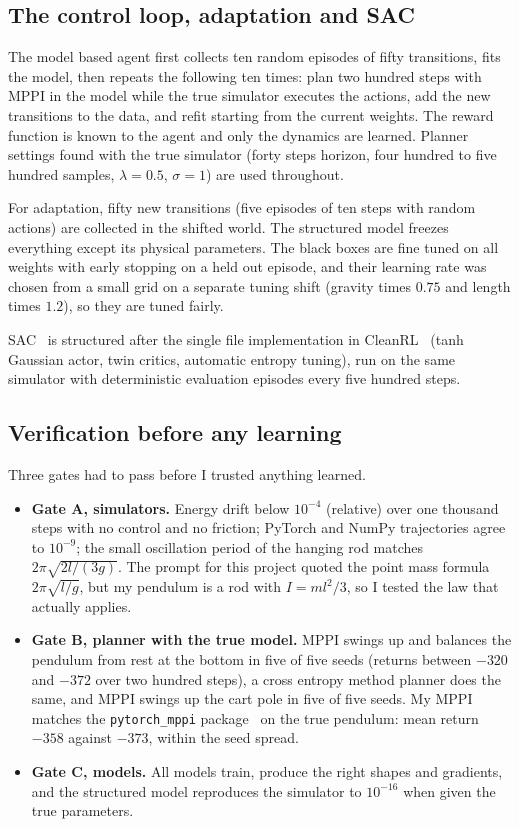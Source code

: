\documentclass[11pt,a4paper]{article}
\begin{document}
\subsection{The control loop, adaptation and SAC}
The model based agent first collects ten random episodes of fifty transitions, fits the model, then repeats the following ten times: plan two hundred steps with MPPI in the model while the true simulator executes the actions, add the new transitions to the data, and refit starting from the current weights. The reward function is known to the agent and only the dynamics are learned. Planner settings found with the true simulator (forty steps horizon, four hundred to five hundred samples, $\lambda=0.5$, $\sigma=1$) are used throughout.

For adaptation, fifty new transitions (five episodes of ten steps with random actions) are collected in the shifted world. The structured model freezes everything except its physical parameters. The black boxes are fine tuned on all weights with early stopping on a held out episode, and their learning rate was chosen from a small grid on a separate tuning shift (gravity times $0.75$ and length times $1.2$), so they are tuned fairly.

SAC~\cite{haarnoja2018sac} is structured after the single file implementation in CleanRL~\cite{huang2022cleanrl} (tanh Gaussian actor, twin critics, automatic entropy tuning), run on the same simulator with deterministic evaluation episodes every five hundred steps.

\subsection{Verification before any learning}
Three gates had to pass before I trusted anything learned.
\begin{itemize}[leftmargin=1.5em]
\item \textbf{Gate A, simulators.} Energy drift below $10^{-4}$ (relative) over one thousand steps with no control and no friction; PyTorch and NumPy trajectories agree to $10^{-9}$; the small oscillation period of the hanging rod matches $2\pi\sqrt{2l/(3g)}$. The prompt for this project quoted the point mass formula $2\pi\sqrt{l/g}$, but my pendulum is a rod with $I=ml^2/3$, so I tested the law that actually applies.
\item \textbf{Gate B, planner with the true model.} MPPI swings up and balances the pendulum from rest at the bottom in five of five seeds (returns between $-320$ and $-372$ over two hundred steps), a cross entropy method planner does the same, and MPPI swings up the cart pole in five of five seeds. My MPPI matches the \texttt{pytorch\_mppi} package~\cite{pytorchmppi} on the true pendulum: mean return $-358$ against $-373$, within the seed spread.
\item \textbf{Gate C, models.} All models train, produce the right shapes and gradients, and the structured model reproduces the simulator to $10^{-16}$ when given the true parameters.
\end{itemize}
\end{document}
